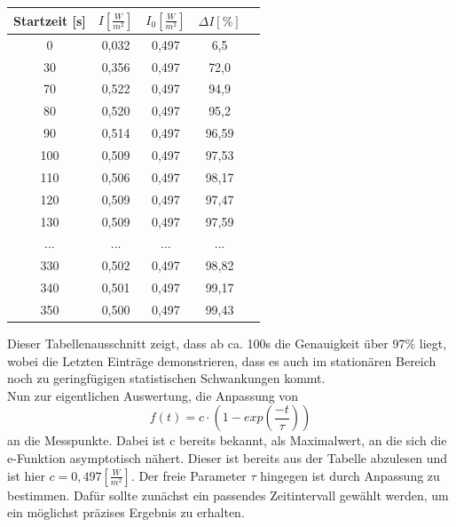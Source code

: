 \documentclass{article}
\begin{document}
            \begin{center}
                \begin{tabular}{|c|c|c|c|c|}
                    \hline
                    Startzeit [s] & $I[\frac{W}{m^2}]$ & $I_0[\frac{W}{m^2}]$ & $\Delta I[\%] $ \\
                    \hline
                    0   & 0,032 & 0,497 & 6,5 \\
                    30  & 0,356 & 0,497 & 72,0 \\
                    70  & 0,522 & 0,497 & 94,9 \\
                    80  & 0,520 & 0,497 & 95,2 \\
                    90  & 0,514 & 0,497 & 96,59 \\
                    100 & 0,509 & 0,497 & 97,53 \\
                    110 & 0,506 & 0,497 & 98,17 \\
                    120 & 0,509 & 0,497 & 97,47 \\
                    130 & 0,509 & 0,497 & 97,59 \\
                    ... & ...   &  ...  & ... \\
                    330 & 0,502 & 0,497 & 98,82 \\
                    340 & 0,501 & 0,497 & 99,17 \\
                    350 & 0,500 & 0,497 & 99,43 \\
                    \hline 
                \end{tabular}
            \end{center}
            Dieser Tabellenausschnitt zeigt, dass ab ca. 100s die Genauigkeit über 97\% liegt, wobei die Letzten
            Einträge demonstrieren, dass es auch im stationären Bereich noch zu geringfügigen statistischen
            Schwankungen kommt.\\
            Nun zur eigentlichen Auswertung, die Anpassung von
            \begin{equation}
                f(t) = c\cdot(1-exp(\frac{-t}{\tau}))
            \end{equation}
            an die Messpunkte. Dabei ist c bereits bekannt, als Maximalwert, an die sich die e-Funktion
            asymptotisch nähert. Dieser ist bereits aus der Tabelle abzulesen und ist hier $c=0,497[\frac{W}{m^2}]$.
            Der freie Parameter $\tau$ hingegen ist durch Anpassung zu bestimmen. Dafür sollte zunächst ein
            passendes Zeitintervall gewählt werden, um ein möglichst präzises Ergebnis zu erhalten.
\end{document}
